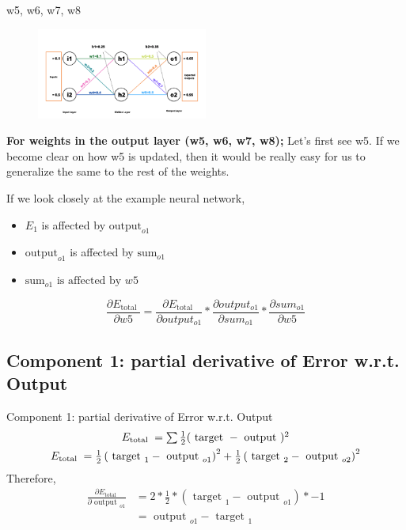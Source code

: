 \documentclass[8pt,dvipsnames]{beamer}
\begin{document}
\begin{frame}{w5, w6, w7, w8}
	\begin{figure}
		\centering
		\includegraphics[width=0.5\textwidth]{imgs/nn_2.png}
	\end{figure}
	\textbf{For weights in the output layer (w5, w6, w7, w8);} Let's first see w5. If we become clear on how w5 is updated, then it would be really easy for us to generalize the same to the rest of the weights. 
	
	If we look closely at the example neural network,
	\begin{itemize}
		\item \(E_1\) is affected by \(\text{output}_{o1}\)
		\item \(\text{output}_{o1}\) is affected by \(\text {sum}_{o 1}\)
		\item \(\text {sum}_{o 1} \text { is affected by } w 5\)
	\end{itemize}
	$$
	\frac{\partial E_{\text {total }}}{\partial w 5}=\frac{\partial E_{\text {total }}}{\partial o u t p u t_{o 1}} * \frac{\partial o u t p u t_{o 1}}{\partial s u m_{o 1}} * \frac{\partial s u m_{o 1}}{\partial w 5}
	$$
\end{frame}

\subsection{Component 1: partial derivative of Error w.r.t. Output}
\begin{frame}{Component 1: partial derivative of Error w.r.t. Output}
	$$
	\begin{array}{c}E_{\text {total }}=\sum \frac{1}{2}(\text { target }- \text { output })^{2} \vspace{4pt}\\ E_{\text {total }}=\frac{1}{2}\left(\text { target }_{1}-\text { output }_{o 1}\right)^{2}+\frac{1}{2}\left(\text { target }_{2}-\text { output }_{o 2}\right)^{2}\end{array}
	$$
	Therefore, 
	\begin{equation*}
		\begin{aligned}
			\frac{\partial E_{\text {total }}}{\partial \text { output }_{o 1}}&=2 * \frac{1}{2} *\left(\text { target }_{1}-\text { output }_{o 1}\right) *-1 \\
			&=\text { output }_{o 1}-\text { target }_{1}\\
		\end{aligned}
	\end{equation*}
\end{frame}
\end{document}
